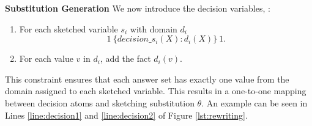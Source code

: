 
\vspace{3pt}
\textbf{Substitution Generation} 
We now introduce the decision variables, :
\begin{enumerate}
\item
For each sketched variable $s_i$ with domain $d_i$ 
$$1~\{ \textit{decision}\_s_i(X) : d_i(X) \}~1 .$$ 
\item 
For each value $v$ in $d_i$, add the fact $d_i(v)$.
\end{enumerate}
This constraint ensures that each answer set has exactly one value from the domain assigned
to each sketched variable. %
This results in a one-to-one mapping between decision atoms and sketching substitution $\theta$. An example can be seen in Lines \ref{line:decision1} and \ref{line:decision2} of Figure \ref{lst:rewriting}.


